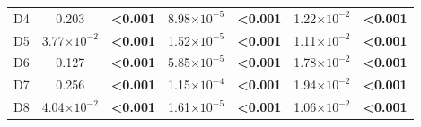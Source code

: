 \documentclass[12pt]{article}
\begin{document}
\begin{table}[h!]
\begin{tabular}{l | c c c c c c }
        D4	&	0.203	&	\textbf{\textless0.001}	&	8.98$\times10^{-5}$	&	\textbf{\textless0.001}	&	1.22$\times10^{-2}$	&	\textbf{\textless0.001}	\\
        D5	&	3.77$\times10^{-2}$	&	\textbf{\textless0.001}	&	1.52$\times10^{-5}$	&	\textbf{\textless0.001}	&	1.11$\times10^{-2}$	&	\textbf{\textless0.001}	\\
        D6	&	0.127	&	\textbf{\textless0.001}	&	5.85$\times10^{-5}$	&	\textbf{\textless0.001}	&	1.78$\times10^{-2}$	&	\textbf{\textless0.001}	\\
        D7	&	0.256	&	\textbf{\textless0.001}	&	1.15$\times10^{-4}$	&	\textbf{\textless0.001}	&	1.94$\times10^{-2}$	&	\textbf{\textless0.001}	\\
        D8	&	4.04$\times10^{-2}$	&	\textbf{\textless0.001}	&	1.61$\times10^{-5}$	&	\textbf{\textless0.001}	&	1.06$\times10^{-2}$	&	\textbf{\textless0.001}	\\
        \hline
        \end{tabular}
        \end{table}
\end{document}
